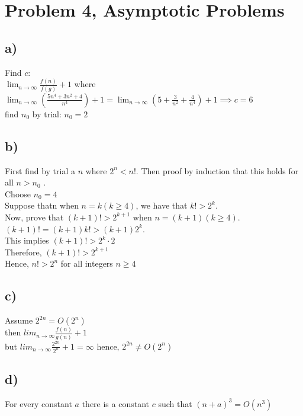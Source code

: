 \documentclass[a4paper,11pt,twoside]{article}
\begin{document}
\section*{Problem 4, Asymptotic Problems}
\subsection*{a)}
Find $c$:\\
$\lim_{n \to \infty} \frac{f(n)}{f(g)}+1$ where \\
$\lim_{n \to \infty}(\frac{5n^{4}+3n^{2}+4}{n^{4}})+1 = \lim_{n \to \infty}(5+ \frac{3}{n^{2}}+\frac{4}{n^{4}})+1 \implies c = 6$\\
find $n_{0}$ by trial: $n_{0} = 2$ \\

\subsection*{b)}
First find by trial a $n$ where $2^{n} < n!$. Then proof by induction that this holds for all $n > n_{0}$ \cite{induction}.\\
Choose $n_{0} = 4$\\
Suppose thatn when $n = k(k \geq 4)$, we have that $k! > 2^{k}$.\\
Now, prove that $(k + 1)! > 2^{k+1}$ when $n = (k + 1)(k \geq 4)$.\\
$(k + 1)! = (k + 1)k! > (k + 1)2^{k}$.\\
This implies $(k+1)! > 2^{k} \cdot 2$\\
Therefore, $(k + 1)! > 2^{k+1}$\\
Hence, $n! > 2^{n}$ for all integers $n \geq 4$\\

\subsection*{c)} 
Assume $2^{2n} = O(2^{n})$\\
then $lim_{n \to \infty} \frac{f(n)}{g(n)}+1$\\
but $lim_{n \to \infty} \frac{2^{2n}}{2^{n}} + 1 = \infty$
hence, $2^{2n} \neq O(2^{n})$\\

\subsection*{d)}
For every constant $a$ there is a constant $c$ such that $(n + a)^{3} = O(n^{3})$ 






\end{document}
